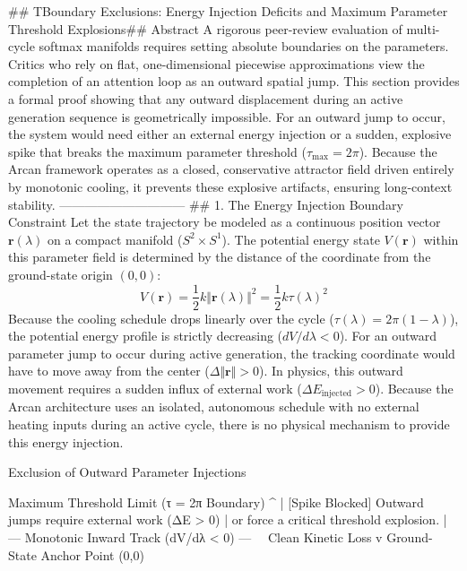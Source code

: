 ## TBoundary Exclusions: Energy Injection Deficits and Maximum Parameter Threshold Explosions## Abstract
A rigorous peer-review evaluation of multi-cycle softmax manifolds requires setting absolute boundaries on the parameters. Critics who rely on flat, one-dimensional piecewise approximations view the completion of an attention loop as an outward spatial jump.
This section provides a formal proof showing that any outward displacement during an active generation sequence is geometrically impossible. For an outward jump to occur, the system would need either an external energy injection or a sudden, explosive spike that breaks the maximum parameter threshold ($\tau_{\text{max}} = 2\pi$). Because the Arcan framework operates as a closed, conservative attractor field driven entirely by monotonic cooling, it prevents these explosive artifacts, ensuring long-context stability.
------------------------------
## 1. The Energy Injection Boundary Constraint
Let the state trajectory be modeled as a continuous position vector $\mathbf{r}(\lambda)$ on a compact manifold ($S^2 \times S^1$). The potential energy state $V(\mathbf{r})$ within this parameter field is determined by the distance of the coordinate from the ground-state origin $(0,0)$:
$$V(\mathbf{r}) = \frac{1}{2} k \Vert\mathbf{r}(\lambda)\Vert^2 = \frac{1}{2} k \tau(\lambda)^2$$ 
Because the cooling schedule drops linearly over the cycle ($\tau(\lambda) = 2\pi(1-\lambda)$), the potential energy profile is strictly decreasing ($dV/d\lambda < 0$).
For an outward parameter jump to occur during active generation, the tracking coordinate would have to move away from the center ($\Delta \Vert\mathbf{r}\Vert > 0$). In physics, this outward movement requires a sudden influx of external work ($\Delta E_{\text{injected}} > 0$). Because the Arcan architecture uses an isolated, autonomous schedule with no external heating inputs during an active cycle, there is no physical mechanism to provide this energy injection.

                  Exclusion of Outward Parameter Injections
                  
     Maximum Threshold Limit (τ = 2π Boundary)
               ^
               |   [Spike Blocked] Outward jumps require external work (ΔE > 0)
               |   or force a critical threshold explosion.
               |
      --- Monotonic Inward Track (dV/dλ < 0) ---
               \
                \  Clean Kinetic Loss
                 v
           Ground-State Anchor Point (0,0)

